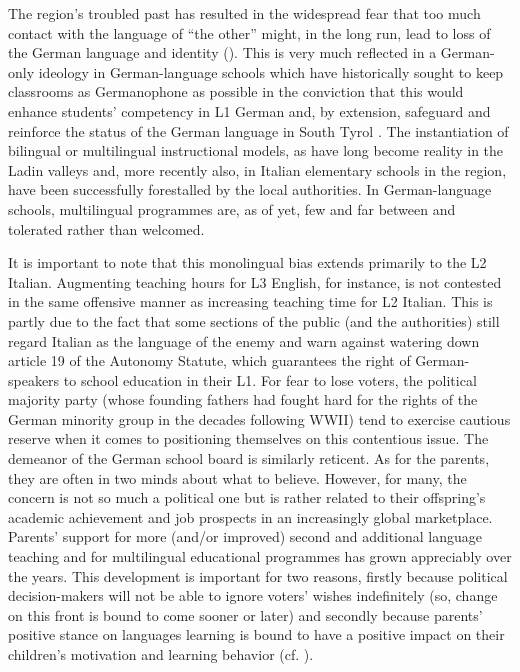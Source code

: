 \documentclass[output=paper]{../langscibook}
\begin{document}
The region’s troubled past has resulted in the widespread fear that too much contact with the language of ``the other'' might, in the long run, lead to loss of the German language and identity (\citealt{DeAngelis2012}). This is very much reflected in a German-only ideology in German-language schools which have historically sought to keep classrooms as Germanophone as possible in the conviction that this would enhance students’ competency in L1 German and, by extension, safeguard and reinforce the status of the German language in South Tyrol \citep{Egger1977}. The instantiation of bilingual or multilingual instructional models, as have long become reality in the Ladin valleys and, more recently also, in Italian elementary schools in the region, have been successfully forestalled by the local authorities. In German-language schools, multilingual programmes are, as of yet, few and far between and tolerated rather than welcomed. 

\largerpage
It is important to note that this monolingual bias extends primarily to the L2 Italian. Augmenting teaching hours for L3 English, for instance, is not contested in the same offensive manner as increasing teaching time for L2 Italian. This is partly due to the fact that some sections of the public (and the authorities) still regard Italian as the language of the enemy and warn against watering down article 19 of the Autonomy Statute, which guarantees the right of German-speakers to school education in their L1. For fear to lose voters, the political majority party (whose founding fathers had fought hard for the rights of the German minority group in the decades following WWII) tend to exercise cautious reserve when it comes to positioning themselves on this contentious issue. The demeanor of the German school board is similarly reticent. As for the parents, they are often in two minds about what to believe. However, for many, the concern is not so much a political one but is rather related to their offspring’s academic achievement and job prospects in an increasingly global marketplace. Parents’ support for more (and/or improved) second and additional language teaching and for multilingual educational programmes has grown appreciably over the years. This development is important for two reasons, firstly because political decision-makers will not be able to ignore voters’ wishes indefinitely (so, change on this front is bound to come sooner or later) and secondly because parents’ positive stance on languages learning is bound to have a positive impact on their children’s motivation and learning behavior (cf. \citealt{Gardner1985}).
\end{document}
